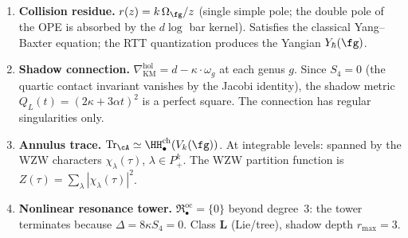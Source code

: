 \begin{computation}
\begin{enumerate}[label=\textup{(\roman*)},nosep]
\item \textbf{Collision residue.}
 $r(z) = k\,\Omega_\fg / z$
 \textup{(}single simple pole; the double pole of the OPE is
 absorbed by the $d\log$ bar kernel\textup{)}.
 Satisfies the classical Yang--Baxter equation; the RTT
 quantization produces the Yangian $Y_\hbar(\fg)$.

\item \textbf{Shadow connection.}
 $\nabla^{\mathrm{hol}}_{\mathrm{KM}} = d - \kappa \cdot \omega_g$
 at each genus $g$. Since $S_4 = 0$ (the quartic contact invariant
 vanishes by the Jacobi identity), the shadow metric
 $Q_L(t) = (2\kappa + 3\alpha t)^2$ is a perfect square.
 The connection has regular singularities only.

\item \textbf{Annulus trace.}
 $\mathrm{Tr}_\cA \simeq \HH^{\mathrm{ch}}_\bullet(V_k(\fg))$.
 At integrable levels: spanned by the WZW characters
 $\chi_\lambda(\tau)$, $\lambda \in P_+^k$.
 The WZW partition function is
 $Z(\tau) = \sum_\lambda |\chi_\lambda(\tau)|^2$.

\item \textbf{Nonlinear resonance tower.}
 $\mathfrak{R}^{\mathrm{oc}}_\bullet = \{0\}$
 beyond degree~$3$: the tower terminates because
 $\Delta = 8\kappa S_4 = 0$.
 Class $\mathbf{L}$ (Lie/tree), shadow depth $r_{\max} = 3$.
\end{enumerate}
\end{computation}

